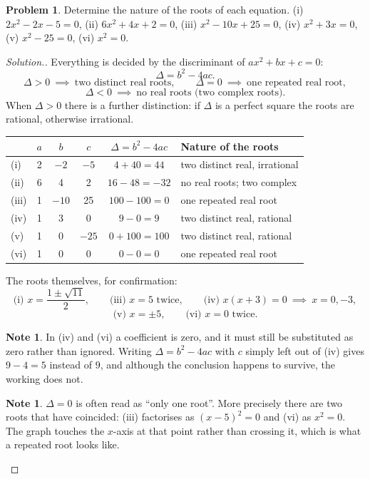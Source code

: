\documentclass[11pt,a4paper]{article}
\theoremstyle{definition}
\newtheorem{note}[thm]{Note}
\newtheorem{problemx}{Problem}[section]
\newenvironment{problem}{\begin{problemx}}{\end{problemx}}
\newenvironment{solution}
  {\renewcommand{\qedsymbol}{}\begin{proof}[\textit{Solution}.]}
  {\end{proof}}
\begin{document}
\begin{problem}
Determine the nature of the roots of each equation.
\quad (i) $2x^2-2x-5=0$, \quad (ii) $6x^2+4x+2=0$, \quad (iii) $x^2-10x+25=0$, \quad
(iv) $x^2+3x=0$, \quad (v) $x^2-25=0$, \quad (vi) $x^2=0$.
\end{problem}

\begin{solution}
Everything is decided by the discriminant of $ax^2+bx+c=0$:
$$\Delta=b^2-4ac.$$
$$\Delta>0\ \implies\ \text{two distinct real roots},\qquad
\Delta=0\ \implies\ \text{one repeated real root},$$
$$\Delta<0\ \implies\ \text{no real roots (two complex roots)}.$$
When $\Delta>0$ there is a further distinction: if $\Delta$ is a perfect square the
roots are rational, otherwise irrational.

\begin{table}[H]
\centering
\begin{tabular}{|l|c|c|c|c|l|}
\hline
 & $a$ & $b$ & $c$ & $\Delta=b^2-4ac$ & Nature of the roots\\
\hline
(i) & 2 & $-2$ & $-5$ & $4+40=44$ & two distinct real, irrational\\
(ii) & 6 & 4 & 2 & $16-48=-32$ & no real roots; two complex\\
(iii) & 1 & $-10$ & 25 & $100-100=0$ & one repeated real root\\
(iv) & 1 & 3 & 0 & $9-0=9$ & two distinct real, rational\\
(v) & 1 & 0 & $-25$ & $0+100=100$ & two distinct real, rational\\
(vi) & 1 & 0 & 0 & $0-0=0$ & one repeated real root\\
\hline
\end{tabular}
\end{table}

The roots themselves, for confirmation:
$$\text{(i) } x=\frac{1\pm\sqrt{11}}{2},\qquad
\text{(iii) } x=5 \text{ twice},\qquad
\text{(iv) } x(x+3)=0\ \implies\ x=0,-3,$$
$$\text{(v) } x=\pm 5,\qquad \text{(vi) } x=0 \text{ twice}.$$

\begin{note}
In (iv) and (vi) a coefficient is zero, and it must still be substituted as zero rather
than ignored. Writing $\Delta=b^2-4ac$ with $c$ simply left out of (iv) gives $9-4=5$
instead of $9$, and although the conclusion happens to survive, the working does not.
\end{note}

\begin{note}
$\Delta=0$ is often read as ``only one root''. More precisely there are two roots that
have coincided: (iii) factorises as $(x-5)^2=0$ and (vi) as $x^2=0$. The graph touches
the $x$-axis at that point rather than crossing it, which is what a repeated root looks
like.
\end{note}
\end{solution}
\end{document}
